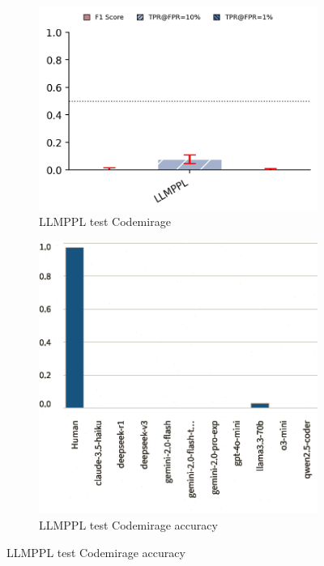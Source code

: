 \begin{figure}[H]
    \centering
    \begin{subfigure}[b]{0.4\textwidth}
        \centering
        \includegraphics[width=\linewidth]{img/TEST/LLMPPL/UncoveringTest.png}
        \caption{LLMPPL test Codemirage}
        \label{fig:6}
    \end{subfigure}
    \hfill
    \begin{subfigure}[t]{0.4\textwidth}
        \centering
        \includegraphics[width=\linewidth]{img/TEST/LLMPPL/visualization(34).png}
        \caption{LLMPPL test Codemirage accuracy}
        \label{fig:b6}
    \end{subfigure}
\end{figure}


